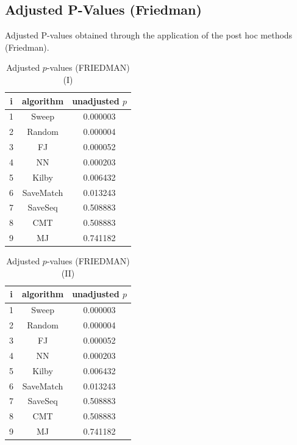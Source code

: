 \documentclass[a4paper,10pt]{article}
\begin{document}
\begin{landscape}
\section{Adjusted P-Values (Friedman)}


Adjusted P-values obtained through the application of the post hoc methods (Friedman).

\begin{table}[!htp]
\centering\small
\begin{tabular}{ccc}
i&algorithm&unadjusted $p$\\
\hline1&Sweep&0.000003\\2&Random&0.000004\\3&FJ&0.000052\\4&NN&0.000203\\5&Kilby&0.006432\\6&SaveMatch&0.013243\\7&SaveSeq&0.508883\\8&CMT&0.508883\\9&MJ&0.741182\\\hline
\end{tabular}
\caption{Adjusted $p$-values (FRIEDMAN) (I)}
\end{table}
\begin{table}[!htp]
\centering\small
\begin{tabular}{ccc}
i&algorithm&unadjusted $p$\\
\hline1&Sweep&0.000003\\2&Random&0.000004\\3&FJ&0.000052\\4&NN&0.000203\\5&Kilby&0.006432\\6&SaveMatch&0.013243\\7&SaveSeq&0.508883\\8&CMT&0.508883\\9&MJ&0.741182\\\hline
\end{tabular}
\caption{Adjusted $p$-values (FRIEDMAN) (II)}
\end{table}

\newpage
\end{landscape}
\end{document}
